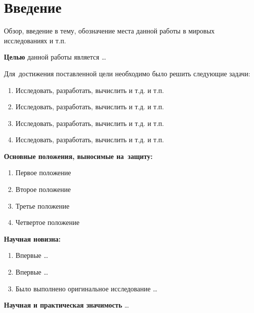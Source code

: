 \chapter*{Введение}							%
%

Обзор, введение в тему, обозначение места данной работы в мировых исследованиях и т.п.

\textbf{Целью} данной работы является \ldots

Для~достижения поставленной цели необходимо было решить следующие задачи:
\begin{enumerate}
  \item Исследовать, разработать, вычислить и т.д. и т.п.
  \item Исследовать, разработать, вычислить и т.д. и т.п.
  \item Исследовать, разработать, вычислить и т.д. и т.п.
  \item Исследовать, разработать, вычислить и т.д. и т.п.
\end{enumerate}

\textbf{Основные положения, выносимые на~защиту:}
\begin{enumerate}
  \item Первое положение
  \item Второе положение
  \item Третье положение
  \item Четвертое положение
\end{enumerate}

\textbf{Научная новизна:}
\begin{enumerate}
  \item Впервые \ldots
  \item Впервые \ldots
  \item Было выполнено оригинальное исследование \ldots
\end{enumerate}

\textbf{Научная и практическая значимость} \ldots

